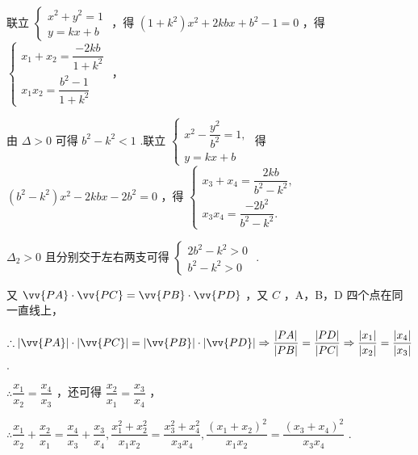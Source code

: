 \begin{enumerate}
\begin{enumerate}
\begin{jieda}
\begin{enumerate}
                联立 $\left\{  \begin{array}{l} {x}^{2} + {y}^{2} = 1 \\  y = {kx} + b \end{array}\right.$ ，得 $\left( {1 + {k}^{2}}\right) {x}^{2} + {2kbx} + {b}^{2} - 1 = 0$ ，得 $\left\{  \begin{array}{l} {x}_{1} + {x}_{2} = \dfrac{-{2kb}}{1 + {k}^{2}} \\  {x}_{1}{x}_{2} = \dfrac{{b}^{2} - 1}{1 + {k}^{2}} \end{array}\right.$ ，
    
                由 $\Delta  > 0$ 可得 ${b}^{2} - {k}^{2} < 1$ .联立 $\left\{  \begin{array}{l} {x}^{2} - \dfrac{{y}^{2}}{{b}^{2}} = 1, \\  y = {kx} + b \end{array}\right.$ 得 $\left( {{b}^{2} - {k}^{2}}\right) {x}^{2} - {2kbx} - 2{b}^{2} = 0$ ，得 $\left\{  \begin{array}{l} {x}_{3} + {x}_{4} = \dfrac{2kb}{{b}^{2} - {k}^{2}}, \\  {x}_{3}{x}_{4} = \dfrac{-2{b}^{2}}{{b}^{2} - {k}^{2}}. \end{array}\right.$
    
                ${\Delta }_{2} > 0$ 且分别交于左右两支可得 $\left\{  \begin{array}{l} 2{b}^{2} - {k}^{2} > 0 \\  {b}^{2} - {k}^{2} > 0 \end{array}\right.$ .
    
                又 $\vv{PA} \cdot  \vv{PC} = \vv{PB} \cdot  \vv{PD}$ ，又 $C$ ，A，B，D 四个点在同一直线上，
                
                $\therefore \left| \vv{PA}\right|  \cdot  \left| \vv{PC}\right|  = \left| \vv{PB}\right|  \cdot  \left| \vv{PD}\right|  \Rightarrow  \dfrac{\left| PA\right| }{\left| PB\right| } = \dfrac{\left| PD\right| }{\left| PC\right| } \Rightarrow  \dfrac{\left| {x}_{1}\right| }{\left| {x}_{2}\right| } = \dfrac{\left| {x}_{4}\right| }{\left| {x}_{3}\right| }$ .
                
                $\therefore \dfrac{{x}_{1}}{{x}_{2}} = \dfrac{{x}_{4}}{{x}_{3}}$ ，还可得 $\dfrac{{x}_{2}}{{x}_{1}} = \dfrac{{x}_{3}}{{x}_{4}}$ ，
                
                $\therefore \dfrac{{x}_{1}}{{x}_{2}} + \dfrac{{x}_{2}}{{x}_{1}} = \dfrac{{x}_{4}}{{x}_{3}} + \dfrac{{x}_{3}}{{x}_{4}},\dfrac{{x}_{1}^{2} + {x}_{2}^{2}}{{x}_{1}{x}_{2}} = \dfrac{{x}_{3}^{2} + {x}_{4}^{2}}{{x}_{3}{x}_{4}},\dfrac{{\left( {x}_{1} + {x}_{2}\right) }^{2}}{{x}_{1}{x}_{2}} = \dfrac{{\left( {x}_{3} + {x}_{4}\right) }^{2}}{{x}_{3}{x}_{4}}$ .
                

\end{enumerate}
\end{jieda}
\end{enumerate}
\end{enumerate}
